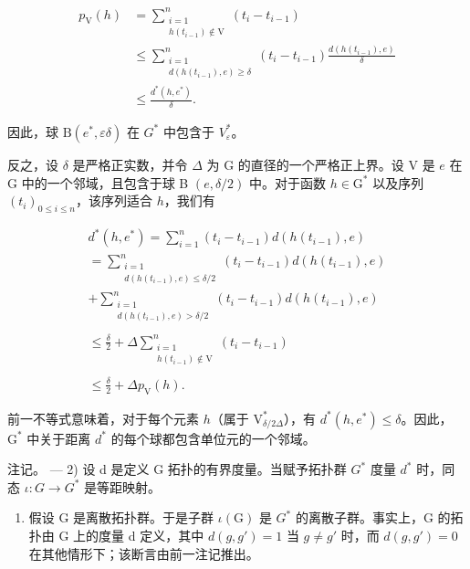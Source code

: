 \[
\begin{aligned} p_{\mathrm{V}}(h) & = \sum_{\substack{i = 1\\ h(t_{i - 1})\not\in\mathrm{V}}}^{n}(t_{i} - t_{i - 1})\\ & \leqslant \sum_{\substack{i = 1\\ d(h(t_{i - 1}),e)\geqslant \delta}}^{n}(t_{i} - t_{i - 1})\frac{d(h(t_{i - 1}),e)}{\delta}\\ & \leqslant \frac{d^{*}(h,e^{*})}{\delta}. \end{aligned}
\]

因此，球 \(\mathrm{B}(e^{*},\varepsilon\delta)\) 在 \(G^{*}\) 中包含于 \(V_{\varepsilon}^{*}\)。

反之，设 \(\delta\) 是严格正实数，并令 \(\Delta\) 为 G 的直径的一个严格正上界。设 V 是 \(e\) 在 G 中的一个邻域，且包含于球 B \((e,\delta/2)\) 中。对于函数 \(h\in\mathrm{G}^{*}\) 以及序列 \((t_{i})_{0\leqslant i\leqslant n}\)，该序列适合 \(h\)，我们有

\[
\begin{array}{l}d^{*}(h,e^{*}) = \sum_{i = 1}^{n}(t_{i} - t_{i - 1})d(h(t_{i - 1}),e)\\ = \sum_{\substack{i = 1\\ d(h(t_{i - 1}),e)\leqslant \delta /2}}^{n}(t_{i} - t_{i - 1})d(h(t_{i - 1}),e)\\ +\sum_{\substack{i = 1\\ d(h(t_{i - 1}),e) > \delta /2}}^{n}(t_{i} - t_{i - 1})d(h(t_{i - 1}),e)\\ \\ \leqslant \frac{\delta}{2} +\Delta \sum_{\substack{i = 1\\ h(t_{i - 1})\not\in\mathrm{V}}}^{n}(t_{i} - t_{i - 1})\\ \\ \leqslant \frac{\delta}{2} +\Delta p_{\mathrm{V}}(h). \end{array}
\]

前一不等式意味着，对于每个元素 \(h\)（属于 \(\mathrm{V}_{\delta/2\Delta}^{*}\)），有 \(d^{*}(h,e^{*})\leqslant\delta\)。因此，\(\mathrm{G}^{*}\) 中关于距离 \(d^{*}\) 的每个球都包含单位元的一个邻域。

注记。 --- 2) 设 d 是定义 G 拓扑的有界度量。当赋予拓扑群 \(G^{*}\) 度量 \(d^{*}\) 时，同态 \(\iota: G \to G^{*}\) 是等距映射。

\begin{enumerate}
\def\labelenumi{\arabic{enumi})}
\setcounter{enumi}{2}
\tightlist
\item
假设 G 是离散拓扑群。于是子群 \(\iota(\mathrm{G})\) 是 \(G^{*}\) 的离散子群。事实上，G 的拓扑由 G 上的度量 d 定义，其中 \(d(g,g') = 1\) 当 \(g \neq g'\) 时，而 \(d(g, g') = 0\) 在其他情形下；该断言由前一注记推出。
\end{enumerate}


